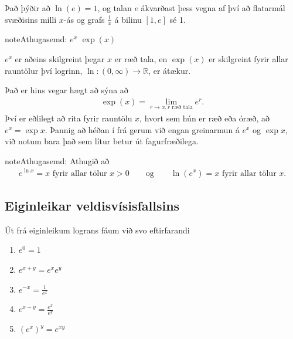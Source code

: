 \documentclass[a4paper,10pt,icelandic]{sphinxmanual}
\begin{document}
Það þýðir að \(\ln(e)=1\), og talan \(e\) ákvarðast þess vegna
af því að flatarmál svæðisins milli \(x\)-ás og grafs
\(\frac 1x\) á bilinu \([1,e]\) sé 1.


\begin{sphinxadmonition}{note}{Athugasemd:}
 \(e^x\)  \(\exp(x)\) 

\(e^x\) er aðeins skilgreint þegar \(x\) er ræð tala, en
\(\exp(x)\) er skilgreint fyrir allar rauntölur því logrinn,
\(\ln:(0,\infty)\to {{\mathbb  R}}\), er átækur.

Það er hins vegar hægt að sýna að
\begin{equation*}
\begin{split}\exp(x)=\lim_{r\to x, r\text{ ræð tala}} e^r.\end{split}
\end{equation*}
Því er eðlilegt að rita fyrir rauntölu \(x\), hvort sem hún er ræð
eða óræð, að \(e^x=\exp x\). Þannig að héðan í frá gerum við engan
greinarmun á \(e^x\) og \(\exp x\), við notum bara það sem lítur
betur út fagurfræðilega.
\end{sphinxadmonition}

\begin{sphinxadmonition}{note}{Athugasemd:}
Athugið að
\begin{equation*}
\begin{split}e^{\ln x}=x \mbox{ fyrir allar tölur }x>0\qquad \mbox{og}
\qquad \ln(e^x)=x  \mbox{ fyrir allar tölur }x.\end{split}
\end{equation*}\end{sphinxadmonition}


\subsection{Eiginleikar veldisvísisfallsins}
\label{\detokenize{kafli04:eiginleikar-veldisvisisfallsins}}
Út frá eiginleikum lograns fáum við svo eftirfarandi
\begin{enumerate}
\item {} 
\(e^0=1\)

\item {} 
\(e^{x+y}=e^x e^y\)

\item {} 
\(e^{-x}=\frac{1}{e^x}\)

\item {} 
\(e^{x-y}=\frac{e^x}{e^y}\)

\item {} 
\(\left(e^x\right)^y=e^{xy}\)

\end{enumerate}
\end{document}
